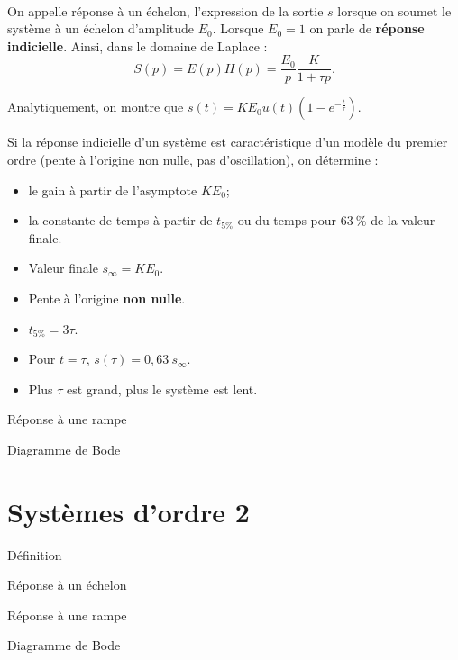 \documentclass[10pt,fleqn]{article} %
\begin{document}
\begin{resultat}~\\
On appelle réponse à un échelon, l'expression de la sortie $s$ lorsque on soumet le système à un échelon d'amplitude $E_0$. Lorsque $E_0=1$ on parle de \textbf{réponse indicielle}.
Ainsi, dans le domaine de Laplace :
$$
S(p)=E(p)H(p) = \dfrac{E_0}{p} \dfrac{K}{1+\tau p}.
$$ 

Analytiquement, on montre que $s(t)=K E_0 u(t) \left(1-e^{-\frac{t}{\tau}}\right)$. 

Si la réponse indicielle d'un système est caractéristique d'un modèle du premier ordre (pente à l'origine non nulle, pas d'oscillation), on détermine :
\begin{itemize}
\item le gain à partir de l'asymptote $K E_0$;
\item la constante de temps à partir de $t_{5\%}$ ou du temps pour $63~\%$ de la valeur finale.
\end{itemize}

\noindent \begin{minipage}[c]{.4\linewidth}

	

\begin{itemize}
\item Valeur finale $s_{\infty}=K E_0$.
\item Pente à l'origine \textbf{non nulle}.
\item $t_{5\%}=3\tau$.
\item Pour $t=\tau$, $s(\tau)=0,63~ s_{\infty}$.
\item Plus $\tau$ est grand, plus le système est lent.
\end{itemize}

\end{minipage} \hfill
\begin{minipage}[c]{.6\linewidth}
\centering

%

\end{minipage}
\end{resultat}

Réponse à une rampe

Diagramme de Bode


\section{Systèmes d'ordre 2}
Définition

Réponse à un échelon 

Réponse à une rampe

Diagramme de Bode
\end{document}
